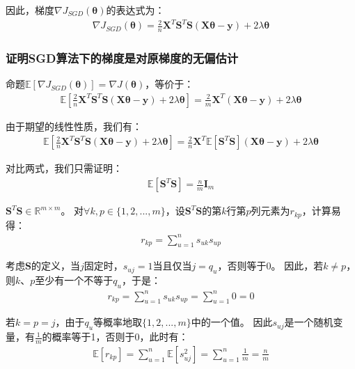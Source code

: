 \documentclass[12pt, a4paper]{article}
\newcommand{\imat}{\bm}
\newcommand{\ivec}{\bm}
\newcommand{\Xm}{\imat{X}}
\newcommand{\thetav}{\ivec{\theta}}
\newcommand{\yv}{\ivec{y}}
\begin{document}
        因此，梯度$\nabla J_{SGD}(\thetav)$的表达式为：
        \begin{equation}\begin{aligned}
        \nabla J_{SGD}(\thetav) = \frac{2}{n} \Xm^T \imat{S}^T \imat{S}(\Xm \thetav - \yv) + 2 \lambda \thetav
        \end{aligned}\end{equation}

    \subsubsection{证明SGD算法下的梯度是对原梯度的无偏估计}

        命题$\mathbb{E}[\nabla J_{SGD}(\thetav)] = \nabla J(\thetav)$，等价于：
        \begin{align*}
        \mathbb{E}[\frac{2}{n} \Xm^T \imat{S}^T \imat{S} (\Xm \thetav - \yv) + 2 \lambda \thetav] = \frac{2}{m} \Xm^T (\Xm \thetav - \yv) + 2 \lambda \thetav
        \end{align*}

        由于期望的线性性质，我们有：
        \begin{align*}
        \mathbb{E}[\frac{2}{n} \Xm^T \imat{S}^T \imat{S} (\Xm \thetav - \yv) + 2 \lambda \thetav]
        = \frac{2}{n} \Xm^T \mathbb{E}[\imat{S}^T \imat{S}] (\Xm \thetav - \yv) + 2 \lambda \thetav
        \end{align*}

        对比两式，我们只需证明：
        \begin{align*}
        \mathbb{E}[\imat{S}^T \imat{S}] = \frac{n}{m} \imat{I}_m
        \end{align*}

        $\imat{S}^T \imat{S} \in \mathbb{R}^{m \times m}$。
        对$\forall k, p \in \{1, 2, ..., m\}$，设$\imat{S}^T \imat{S}$的第$k$行第$p$列元素为$r_{kp}$，计算易得：
        \begin{align*}
        r_{kp} = \sum_{u = 1}^{n} s_{uk}s_{up}
        \end{align*}

        考虑$\imat{S}$的定义，当$j$固定时，$s_{uj} = 1$当且仅当$j = q_u$，否则等于0。
        因此，若$k \ne p$，则$k$、$p$至少有一个不等于$q_u$，于是：
        \begin{align*}
        r_{kp} = \sum_{u = 1}^{n} s_{uk}s_{up} = \sum_{u = 1}^{n} 0 = 0
        \end{align*}

        若$k = p = j$，由于$q_u$等概率地取$\{1, 2, ..., m\}$中的一个值。
        因此$s_{uj}$是一个随机变量，有$\frac{1}{m}$的概率等于1，否则于0，此时有：
        \begin{align*}
        \mathbb{E}[r_{kp}] = \sum_{u = 1}^{n} \mathbb{E}[s_{uj}^2] = \sum_{u = 1}^{n} \frac{1}{m} = \frac{n}{m}
        \end{align*}
\end{document}
